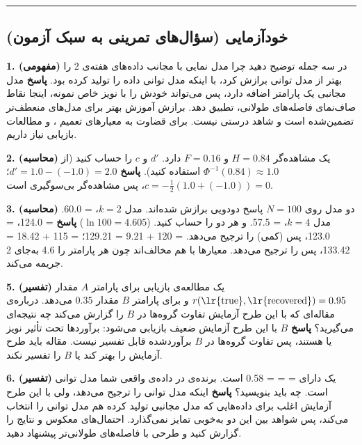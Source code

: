 \begin{center}\rule{0.5\linewidth}{0.5pt}\end{center}

\subsection{خودآزمایی (سؤال‌های تمرینی به سبک آزمون)}

\textbf{1. (مفهومی)} در سه جمله توضیح دهید چرا مدل نمایی با مجانب
داده‌های هفته‌ی 2 را بهتر از مدل توانی برازش کرد، با اینکه مدل توانی داده
را تولید کرده بود. \textbf{پاسخ} مدل مجانبی یک پارامتر اضافه دارد، پس
می‌تواند خودش را با نویز خاص نمونه، اینجا نقاط صاف‌نمای فاصله‌های طولانی،
تطبیق دهد. برازش آموزش بهتر برای مدل‌های منعطف‌تر تضمین‌شده است و شاهد
درستی نیست. برای قضاوت به معیارهای تعمیم ،  و
مطالعات بازیابی نیاز داریم.

\textbf{2. (محاسبه)} یک مشاهده‌گر \(H = 0.84\) و \(F = 0.16\) دارد.
\(d'\) و \(c\) را حساب کنید (از \(\Phi^{-1}(0.84) \approx 1.0\) استفاده
کنید). \textbf{پاسخ} \(d' = 1.0 - (-1.0) = 2.0\)؛
\(c = -\tfrac12(1.0 + (-1.0)) = 0\)، پس مشاهده‌گر بی‌سوگیری است.

\textbf{3. (محاسبه)} دو مدل روی \(N = 100\) پاسخ دودویی برازش شده‌اند.
مدل  \(k = 2\)،  = 60.0. مدل  \(k = 4\)، 
= 57.5.  و  هر دو را حساب کنید. (\(\ln 100 = 4.605\))
\textbf{پاسخ}  = 124.0،  = 123.0، پس  (کمی)
 را ترجیح می‌دهد.  = 120 + 9.21 = 129.21؛  = 115 +
18.42 = 133.42، پس  را ترجیح می‌دهد. معیارها با هم مخالف‌اند چون
 هر پارامتر را 4.6 به‌جای 2 جریمه می‌کند.

\textbf{5. (تفسیر)} یک مطالعه‌ی بازیابی برای پارامتر \(A\) مقدار
\(r(\text{\lr{true}}, \text{\lr{recovered}}) = 0.95\) و برای پارامتر \(B\) مقدار
\(0.35\) می‌دهد. درباره‌ی مقاله‌ای که با این طرح آزمایش تفاوت گروه‌ها در
\(B\) را گزارش می‌کند چه نتیجه‌ای می‌گیرید؟ \textbf{پاسخ} \(B\) با این طرح
آزمایش ضعیف بازیابی می‌شود: برآوردها تحت تأثیر نویز یا 
هستند، پس تفاوت گروه‌ها در \(B\) برآوردشده قابل تفسیر نیست. مقاله باید
طرح آزمایش را بهتر کند یا \(B\) را تفسیر نکند.

\textbf{6. (تفسیر)} یک  دارای  =
 \lr{\textbar}  =  = 0.58 است.
برنده‌ی  در داده‌ی واقعی شما مدل توانی است. چه باید بنویسید؟
\textbf{پاسخ} اینکه  مدل توانی را ترجیح می‌دهد، ولی با این طرح
آزمایش  اغلب برای داده‌هایی که مدل مجانبی تولید کرده هم مدل توانی
را انتخاب می‌کند، پس شواهد بین این دو به‌خوبی تمایز نمی‌گذارد. احتمال‌های
معکوس و نتایج  را گزارش کنید و طرحی با فاصله‌های طولانی‌تر
پیشنهاد دهید.

